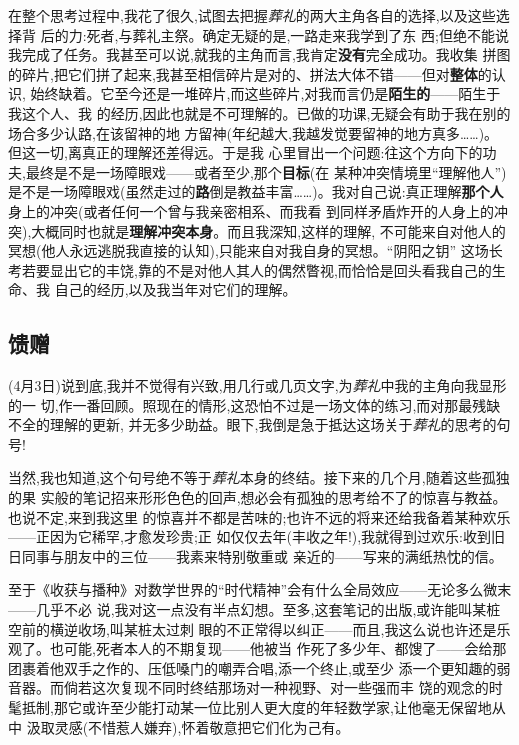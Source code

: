 在整个思考过程中,我花了很久,试图去把握\emph{葬礼}的两大主角各自的选择,以及这些选择背
后的力:死者,与葬礼主祭。确定无疑的是,一路走来我学到了东
西;但绝不能说我完成了任务。我甚至可以说,就我的主角而言,我肯定\textbf{没有}完全成功。我收集
拼图的碎片,把它们拼了起来,我甚至相信碎片是对的、拼法大体不错——但对\textbf{整体}的认识,
始终缺着。它至今还是一堆碎片,而这些碎片,对我而言仍是\textbf{陌生的}——陌生于我这个人、我
的经历,因此也就是不可理解的。已做的功课,无疑会有助于我在别的场合多少认路,在该留神的地
方留神(年纪越大,我越发觉要留神的地方真多……)。但这一切,离真正的理解还差得远。于是我
心里冒出一个问题:往这个方向下的功夫,最终是不是一场障眼戏——或者至少,那个\textbf{目标}(在
某种冲突情境里“理解他人”)是不是\dmark{}一场障眼戏(虽然走过的\textbf{路}倒是教益丰富……)。我对自己说:真正理解\textbf{那个人}身上的冲突(或者任何一个曾与我亲密相系、而我看
到同样矛盾炸开的人身上的冲突),大概同时也就是\textbf{理解冲突本身}。而且我深知,这样的理解,
不可能来自对他人的冥想(他人永远逃脱我直接的认知),只能来自对我自身的冥想。“阴阳之钥”
这场长考若要显出它的丰饶,靠的不是对他人其人的偶然瞥视,而恰恰是回头看我自己的生命、我
自己的经历,以及我当年对它们的理解。

\subsection{馈赠}   %


(4月3日)说到底,我并不觉得有兴致,用几行或几页文字,为\emph{葬礼}中我的主角向我显形的一
切,作一番回顾。照现在的情形,这恐怕不过是一场文体的练习,而对那最残缺不全的理解的更新,
并无多少助益。眼下,我倒是急于抵达这场关于\emph{葬礼}的思考的句号!

当然,我也知道,这个句号绝不等于\emph{葬礼}本身的终结。接下来的几个月,随着这些孤独的果
实般的笔记招来形形色色的回声,想必会有孤独的思考给不了的惊喜与教益。也说不定,来到我这里
的惊喜并不都是苦味的;也许不远的将来还给我备着某种欢乐——正因为它稀罕,才愈发珍贵;正
如仅仅去年(丰收之年!),我就得到过欢乐:收到旧日同事与朋友中的三位——我素来特别敬重或
亲近的——写来的满纸热忱的信。

至于《收获与播种》对数学世界的“时代精神”会有什么全局效应——无论多么微末——几乎不必
说,我对这一点没有半点幻想。至多,这套笔记的出版,或许能叫某桩空前的横逆收场,叫某桩太过刺
眼的不正常得以纠正——而且,我这么说也许还是乐观了。也可能,死者本人的不期复现——他被当
作死了多少年、都馊了——会给那团裹着他双手之作的、压低嗓门的嘲弄合唱,添一个\dmark{}终止,或至少
添一个更知趣的弱音器。而倘若这次复现不同时终结那场对一种视野、对一些强而丰
饶的观念的时髦抵制,那它或许至少能打动某一位比别人更大度的年轻数学家,让他毫无保留地从中
汲取灵感(不惜惹人嫌弃),怀着敬意把它们化为己有。

